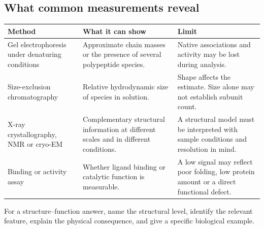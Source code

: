 \documentclass[12pt,a4paper]{article}
\begin{document}
\subsection{What common measurements reveal}
\par\vspace{5pt}
\begingroup
\setlength{\extrarowheight}{1pt}
\noindent\begin{tabularx}{\linewidth}{|B{3.6cm}|Y|Y|}
\hline
\textbf{Method} & \textbf{What it can show} & \textbf{Limit} \\ \hline
Gel electrophoresis under denaturing conditions & Approximate chain masses or the presence of several polypeptide species. & Native associations and activity may be lost during analysis. \\ \hline
Size-exclusion chromatography & Relative hydrodynamic size of species in solution. & Shape affects the estimate. Size alone may not establish subunit count. \\ \hline
X-ray crystallography, NMR or cryo-EM & Complementary structural information at different scales and in different conditions. & A structural model must be interpreted with sample conditions and resolution in mind. \\ \hline
Binding or activity assay & Whether ligand binding or catalytic function is measurable. & A low signal may reflect poor folding, low protein amount or a direct functional defect. \\ \hline
\end{tabularx}\par
\endgroup
\begin{tcolorbox}[masonbox, title={Exam response pattern}]
For a structure--function answer, name the structural level, identify the relevant feature, explain the physical consequence, and give a specific biological example.
\end{tcolorbox}
\end{document}
